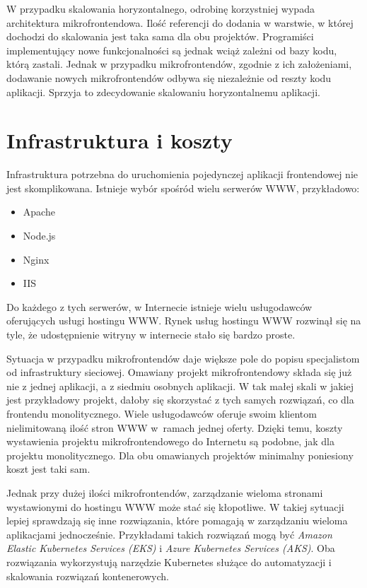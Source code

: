 \documentclass{SGGW-thesis}
\begin{document}
{  W przypadku skalowania horyzontalnego, odrobinę korzystniej wypada architektura mikrofrontendowa. Ilość referencji do dodania w warstwie, w której dochodzi do skalowania jest taka sama dla obu projektów. Programiści implementujący nowe funkcjonalności są jednak wciąż zależni od bazy kodu, którą zastali. Jednak w przypadku mikrofrontendów, zgodnie z ich założeniami, dodawanie nowych mikrofrontendów odbywa się niezależnie od reszty kodu aplikacji. Sprzyja to zdecydowanie skalowaniu horyzontalnemu aplikacji.

  \section{Infrastruktura i koszty}
  Infrastruktura potrzebna do uruchomienia pojedynczej aplikacji frontendowej nie jest skomplikowana. Istnieje wybór spośród wielu serwerów WWW, przykładowo:

  \begin{itemize}
    \item Apache
    \item Node.js
    \item Nginx
    \item IIS
  \end{itemize}

  Do każdego z tych serwerów, w Internecie istnieje wielu usługodawców oferujących usługi hostingu WWW. Rynek usług hostingu WWW rozwinął się na tyle, że udostępnienie witryny w internecie stało się bardzo proste.

  Sytuacja w przypadku mikrofrontendów daje większe pole do popisu specjalistom od infrastruktury sieciowej. Omawiany projekt mikrofrontendowy składa się już nie z jednej aplikacji, a z siedmiu osobnych aplikacji. W tak małej skali w jakiej jest przykładowy projekt, dałoby się skorzystać z tych samych rozwiązań, co dla frontendu monolitycznego. Wiele usługodawców \cite{ovh, az} oferuje swoim klientom nielimitowaną ilość stron WWW w~ramach jednej oferty. Dzięki temu, koszty wystawienia projektu mikrofrontendowego do Internetu są podobne, jak dla projektu monolitycznego. Dla obu omawianych projektów minimalny poniesiony koszt jest taki sam.
  
  Jednak przy dużej ilości mikrofrontendów, zarządzanie wieloma stronami wystawionymi do hostingu WWW może stać się kłopotliwe. W takiej sytuacji lepiej sprawdzają się inne rozwiązania, które pomagają w zarządzaniu wieloma aplikacjami jednocześnie. Przykładami takich rozwiązań mogą być \textit{Amazon Elastic Kubernetes Services (EKS)} i \textit{Azure Kubernetes Services (AKS)}. Oba rozwiązania wykorzystują narzędzie Kubernetes \cite{kubernetes} służące do automatyzacji i skalowania rozwiązań kontenerowych.

}
\end{document}
